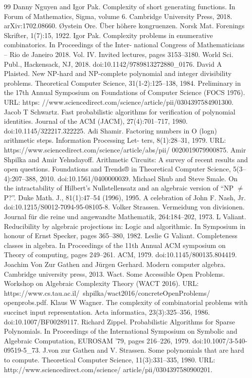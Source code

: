 \begin{thebibliography}{99}
 Danny Nguyen and Igor Pak. Complexity of short generating functions. In Forum of Mathematics, Sigma, volume 6. Cambridge University Press, 2018. arXiv:1702.08660.
 Øystein Ore. Über höhere kongruenzen. Norsk Mat. Forenings Skrifter, 1(7):15, 1922.
 Igor Pak. Complexity problems in enumerative combinatorics. In Proceedings of the Inter- national Congress of Mathematicians – Rio de Janeiro 2018. Vol. IV. Invited lectures, pages 3153–3180. World Sci. Publ., Hackensack, NJ, 2018. doi:10.1142/9789813272880\_0176.
 David A Plaisted. New NP-hard and NP-complete polynomial and integer divisibility problems. Theoretical Computer Science, 31(1-2):125–138, 1984. Preliminary in the 17th Annual Symposium on Foundations of Computer Science (FOCS 1976). URL: https: //www.sciencedirect.com/science/article/pii/0304397584901300.
 Jacob T Schwartz. Fast probabilistic algorithms for verification of polynomial identities. Journal of the ACM (JACM), 27(4):701–717, 1980. doi:10.1145/322217.322225.
 Adi Shamir. Factoring numbers in O (logn) arithmetic steps. Information Processing Let- ters, 8(1):28–31, 1979. URL: https://www.sciencedirect.com/science/article/abs/pii/ 0020019079900875.
 Amir Shpilka and Amir Yehudayoff. Arithmetic Circuits: A survey of recent results and open questions. Foundations and Trends® in Theoretical Computer Science, 5(3–4):207–388, 2010. doi:10.1561/0400000039.
 Michael Shub and Steve Smale. On the intractability of Hilbert’s Nullstellensatz and an algebraic version of “NP $\neq$ P?”. Duke Math. J., 81(1):47–54 (1996), 1995. A celebration of John F. Nash, Jr. doi:10.1215/S0012-7094-95-08105-8.
 Volker Strassen. Vermeidung von divisionen. Journal für die reine und angewandte Mathematik, 264:184–202, 1973.
 L Valiant. Reducibility by algebraic projections in: Logic and algorithmic. In Symposium in honour of Ernst Specker, pages 365–380, 1982.
 Leslie G Valiant. Completeness classes in algebra. In Proceedings of the 11th Annual ACM symposium on Theory of computing, pages 249–261. ACM, 1979. doi:10.1145/800135.804419.
 Joachim Von Zur Gathen and Jürgen Gerhard. Modern computer algebra. Cambridge university press, 2013.
 Wact. Some Accessible Open Problems. Workshop on Algebraic Complexity Theory (WACT 2016).   URL: https://www.cs.tau.ac.il/~shpilka/wact2016/concreteOpenProblems/ openprobs.pdf.
 Klaus W Wagner. The complexity of combinatorial problems with succinct input representation. Acta informatica, 23(3):325–356, 1986. doi:10.1007/BF00289117.
 Richard Zippel. Probabilistic Algorithms for Sparse Polynomials. In Proceedings of the International Symposium on Symbolic and Algebraic Computation, EUROSAM ’79, pages 216–226, 1979. doi:10.1007/3-540-09519-5\_73.
 J.von zur Gathen and V. Strassen. Some polynomials that are hard to compute. Theoretical Computer Science, 11(3):331–335, 1980. URL: http://www.sciencedirect.com/science/ article/pii/0304397580900201.
\end{thebibliography}
